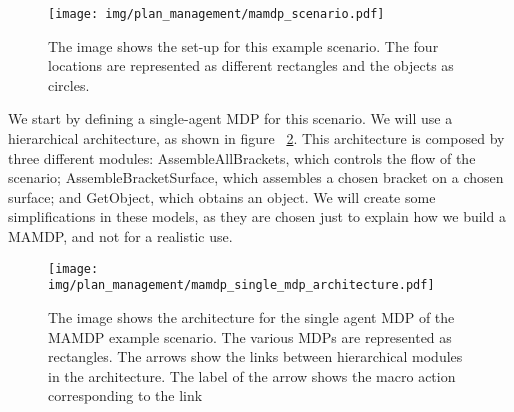  \begin{figure}[ht!]
	\texttt{[image: img/plan\_management/mamdp\_scenario.pdf]}
	\caption[MAMDP example scenario]{The image shows the set-up for this example scenario. The four locations are represented as different rectangles and the objects as circles. }
	\label{fig:plan_management-mamdp_scenario}
\end{figure}

We start by defining a single-agent MDP for this scenario. We will use a hierarchical architecture, as shown in figure ~\ref{fig:plan_management-mamdp_single_mdp_architecture}. This architecture is composed by three different modules: AssembleAllBrackets, which controls the flow of the scenario; AssembleBracketSurface, which assembles a chosen bracket on a chosen surface; and GetObject, which obtains an object. We will create some simplifications in these models, as they are chosen just to explain how we build a MAMDP, and not for a realistic use.

\begin{figure}[ht!]
	\texttt{[image: img/plan\_management/mamdp\_single\_mdp\_architecture.pdf]}
	\caption[MAMDP example single MDP]{The image shows the architecture for the single agent MDP of the MAMDP example scenario. The various MDPs are represented as rectangles. The arrows show the links between hierarchical modules in the architecture. The label of the arrow shows the macro action corresponding to the link}
	\label{fig:plan_management-mamdp_single_mdp_architecture}
\end{figure}


